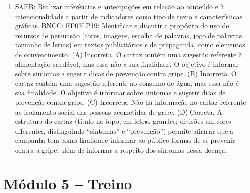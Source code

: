 \begin{enumerate}
\item
SAEB: Realizar inferências e antecipações em relação ao conteúdo
e à intencionalidade a partir de indicadores como tipo de texto e
características gráficas.
BNCC: EF03LP19: Identificar e discutir o propósito do uso de recursos de
persuasão (cores, imagens, escolha de palavras, jogo de palavras,
tamanho de letras) em textos publicitários e de propaganda, como
elementos de convencimento.
(A) Incorreta. O cartaz contém uma sugestão referente à alimentação 
saudável, mas essa não é sua finalidade. O objetivo é informar sobre 
sintomas e sugerir dicas de prevenção contra gripe.  
(B) Incorreta. O cartaz contém uma sugestão referente ao consumo de água,
mas essa não é sua finalidade. O objetivo é informar sobre sintomas e 
sugerir dicas de prevenção contra gripe.
(C) Incorreta. Não há informação no cartaz referente ao isolamento social 
das pessoas acometidas de gripe. 
(D) Correta. A estrutura do cartaz (título no topo, em letras grandes; 
divisões em cores diferentes, distinguindo ``sintomas'' e ``prevenção'') 
permite afirmar que a campanha tem como finalidade informar ao público 
formas de se prevenir contra a gripe, além de informar a respeito dos
sintomas dessa doença.
\end{enumerate}

\section*{Módulo 5 – Treino}

